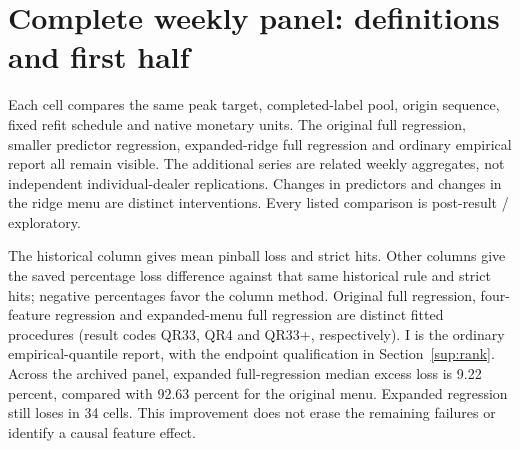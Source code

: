 \section{Complete weekly panel: definitions and first half}\label{sup:panel}

Each cell compares the same peak target, completed-label pool,
origin sequence, fixed refit schedule and native monetary units. The original
full regression, smaller predictor regression, expanded-ridge full regression
and ordinary empirical report all remain visible. The additional series are
related weekly aggregates, not independent individual-dealer replications.
Changes in predictors and changes in the ridge menu are distinct interventions.
Every listed comparison is post-result / exploratory.

The historical column gives mean pinball loss and strict hits. Other columns
give the saved percentage loss difference against that same historical rule and
strict hits; negative percentages favor the column method. Original full
regression, four-feature regression and expanded-menu full regression are
distinct fitted procedures (result codes QR33, QR4 and QR33+, respectively).
I is the ordinary
empirical-quantile report, with the endpoint qualification in Section~\ref{sup:rank}.
Across the archived panel, expanded full-regression median excess
loss is 9.22 percent,
compared with 92.63 percent for the original menu. Expanded regression still loses in 34 cells.
This improvement does not erase the remaining failures or identify a causal
feature effect.\begingroup
\footnotesize
\setlength{\tabcolsep}{3pt}
\renewcommand{\arraystretch}{1.12}
